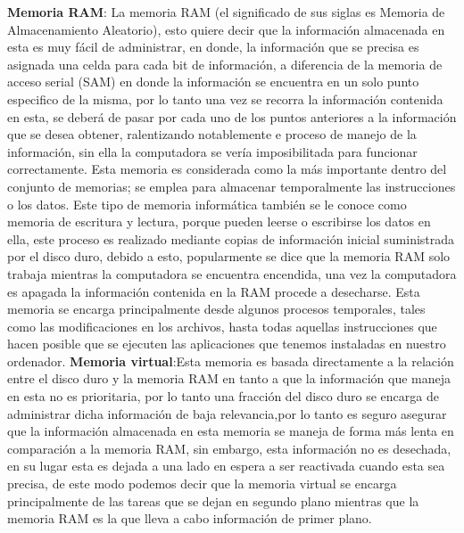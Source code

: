 \documentclass[12pt]{article}
\begin{document}
\begin{itemize}
\vspace{15PT}
\newline
\textbf{Memoria RAM}: La memoria RAM (el significado de sus siglas es Memoria de Almacenamiento Aleatorio), esto quiere decir que la información almacenada en esta es muy fácil de administrar, en donde, la información que se precisa es asignada una celda para cada bit de información, a diferencia de la memoria de acceso serial (SAM) en donde la información se encuentra en un solo punto especifico de la misma, por lo tanto una vez se recorra la información contenida en esta, se deberá de pasar por cada uno de los puntos anteriores a la información que se desea obtener, ralentizando notablemente e proceso de manejo de la información, sin ella la computadora se vería imposibilitada para funcionar correctamente. Esta memoria es considerada como la más importante dentro del conjunto de memorias; se emplea para almacenar temporalmente las instrucciones o los datos. Este tipo de memoria informática también se le conoce como memoria de escritura y lectura, porque pueden leerse o escribirse los datos en ella, este proceso es realizado mediante copias de información inicial suministrada por el disco duro, debido a esto, popularmente se dice que la memoria RAM solo trabaja mientras la computadora se encuentra encendida, una vez la computadora es apagada la información contenida en la RAM procede a desecharse. Esta memoria se encarga principalmente desde algunos procesos temporales, tales como las modificaciones en los archivos, hasta todas aquellas instrucciones que hacen posible que se ejecuten las aplicaciones que tenemos instaladas en nuestro ordenador.
\newline
\cite{conociendo}
\newline
\cite{dos}
\vspace{15PT}
\newline
\textbf{Memoria virtual}:Esta memoria es basada directamente a la relación entre el disco duro y la memoria RAM en tanto a que la información que maneja en esta no es prioritaria, por lo tanto una fracción del disco duro se encarga de administrar dicha información de baja relevancia,por lo tanto es seguro asegurar que la información almacenada en  esta memoria se maneja de forma más lenta en comparación a la memoria RAM, sin embargo, esta información no es desechada, en su lugar esta es dejada a una lado en espera a ser reactivada cuando esta sea precisa, de este modo podemos decir que la memoria virtual se encarga principalmente de las tareas que se dejan en segundo plano mientras que la memoria RAM es la que lleva a cabo información de primer plano.

\end{itemize}
\end{document}
